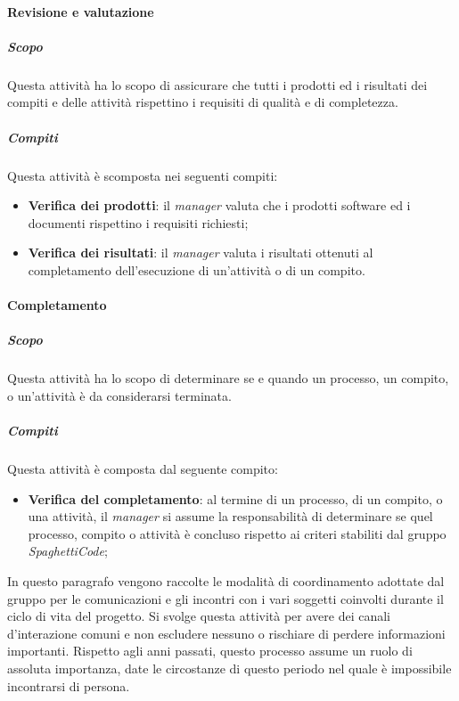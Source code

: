 \paragraph{Revisione e valutazione}
\label{par:revisione_e_valutazione}
\subparagraph{Scopo}
\label{par:revisione_e_valutazione:scopo}
Questa attività ha lo scopo di assicurare che tutti i prodotti ed i risultati dei compiti e delle attività rispettino i requisiti di qualità e di completezza.\\
\subparagraph{Compiti}
\label{par:revisione_e_valutazione:Compiti}
Questa attività è scomposta nei seguenti compiti:
\begin{itemize}
    \item \textbf{Verifica dei prodotti}: il \emph{manager} valuta che i prodotti software ed i documenti rispettino i requisiti richiesti;
    \item \textbf{Verifica dei risultati}: il \emph{manager} valuta i risultati ottenuti al completamento dell'esecuzione di un'attività o di un compito.
\end{itemize}

\paragraph{Completamento}
\label{par:completamento}
\subparagraph{Scopo}
\label{par:completamento:scopo}
Questa attività ha lo scopo di determinare se e quando un processo, un compito, o un'attività è da considerarsi terminata.\\
\subparagraph{Compiti}
\label{par:completamento:compiti}
Questa attività è composta dal seguente compito:
\begin{itemize}
	\item \textbf{Verifica del completamento}: al termine di un processo, di un compito, o una attività, il \emph{manager} si assume la responsabilità di determinare se quel processo, compito o attività è concluso rispetto ai criteri stabiliti dal gruppo \emph{SpaghettiCode};
\end{itemize}


In questo paragrafo vengono raccolte le modalità di coordinamento adottate dal gruppo per le comunicazioni e gli
incontri con i vari soggetti coinvolti durante il ciclo di vita del progetto. Si svolge questa attività per avere
dei canali d'interazione comuni e non escludere nessuno o rischiare di perdere informazioni importanti. Rispetto
agli anni passati, questo processo assume un ruolo di assoluta importanza, date le circostanze di questo periodo
nel quale è impossibile incontrarsi di persona.

